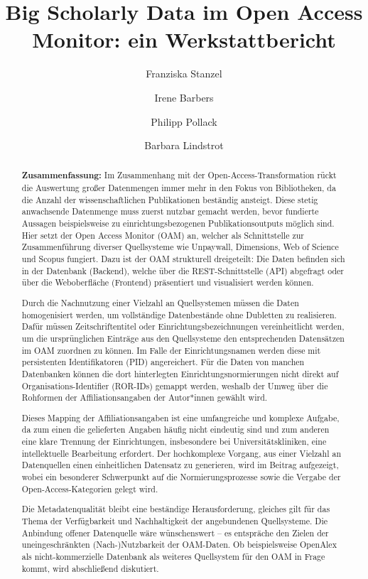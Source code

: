 \documentclass[a4paper,
fontsize=11pt,
oneside,
numbers=noperiodatend,
parskip=half-,
bibliography=totoc,
final
]{scrartcl}
\title{\LARGE{Big Scholarly Data im Open Access Monitor: ein Werkstattbericht}}%
\author{Franziska Stanzel \and Irene Barbers \and Philipp Pollack \and Barbara Lindstrot} %
\date{}
\begin{document}
\maketitle
\thispagestyle{fancyplain} 

\begin{abstract}
\noindent
\textbf{Zusammenfassung:} Im Zusammenhang mit der
Open-Access-Transformation rückt die Auswertung großer Datenmengen immer
mehr in den Fokus von Bibliotheken, da die Anzahl der wissenschaftlichen
Publikationen beständig ansteigt. Diese stetig anwachsende Datenmenge
muss zuerst nutzbar gemacht werden, bevor fundierte Aussagen
beispielsweise zu einrichtungsbezogenen Publikationsoutputs möglich
sind. Hier setzt der Open Access Monitor (OAM) an, welcher als
Schnittstelle zur Zusammenführung diverser Quellsysteme wie Unpaywall,
Dimensions, Web of Science und Scopus fungiert. Dazu ist der OAM
strukturell dreigeteilt: Die Daten befinden sich in der Datenbank
(Backend), welche über die REST-Schnittstelle (API) abgefragt oder über
die Weboberfläche (Frontend) präsentiert und visualisiert werden können.

Durch die Nachnutzung einer Vielzahl an Quellsystemen müssen die Daten
homogenisiert werden, um vollständige Datenbestände ohne Dubletten zu
realisieren. Dafür müssen Zeitschriftentitel oder
Einrichtungsbezeichnungen vereinheitlicht werden, um die ursprünglichen
Einträge aus den Quellsysteme den entsprechenden Datensätzen im OAM
zuordnen zu können. Im Falle der Einrichtungsnamen werden diese mit
persistenten Identifikatoren (PID) angereichert. Für die Daten von
manchen Datenbanken können die dort hinterlegten
Einrichtungsnormierungen nicht direkt auf Organisations-Identifier
(ROR-IDs) gemappt werden, weshalb der Umweg über die Rohformen der
Affiliationsangaben der Autor*innen gewählt wird.

Dieses Mapping der Affiliationsangaben ist eine umfangreiche und
komplexe Aufgabe, da zum einen die gelieferten Angaben häufig nicht
eindeutig sind und zum anderen eine klare Trennung der Einrichtungen,
insbesondere bei Universitätskliniken, eine intellektuelle Bearbeitung
erfordert. Der hochkomplexe Vorgang, aus einer Vielzahl an Datenquellen
einen einheitlichen Datensatz zu generieren, wird im Beitrag aufgezeigt,
wobei ein besonderer Schwerpunkt auf die Normierungsprozesse sowie die
Vergabe der Open-Access-Kategorien gelegt wird.

Die Metadatenqualität bleibt eine beständige Herausforderung, gleiches
gilt für das Thema der Verfügbarkeit und Nachhaltigkeit der angebundenen
Quellsysteme. Die Anbindung offener Datenquelle wäre wünschenswert -- es
entspräche den Zielen der uneingeschränkten (Nach-)Nutzbarkeit der
OAM-Daten. Ob beispielsweise OpenAlex als nicht-kommerzielle Datenbank
als weiteres Quellsystem für den OAM in Frage kommt, wird abschließend
diskutiert.


\end{abstract}
\end{document}
